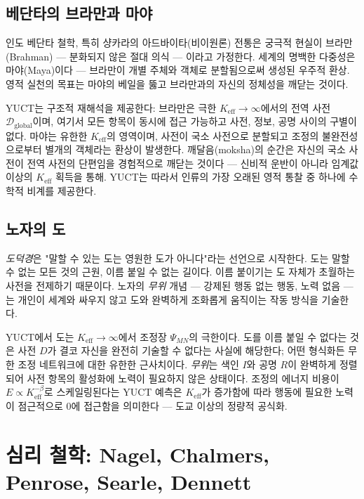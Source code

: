 \documentclass[12pt,a4paper]{article}
\begin{document}
	\subsection{베단타의 브라만과 마야}
	
	인도 베단타 철학, 특히 샹카라의 아드바이타(비이원론) 전통은 궁극적 현실이 브라만(Brahman) — 분화되지 않은 절대 의식 — 이라고 가정한다. 세계의 명백한 다중성은 마야(Maya)이다 — 브라만이 개별 주체와 객체로 분할됨으로써 생성된 우주적 환상. 영적 실천의 목표는 마야의 베일을 뚫고 브라만과의 자신의 정체성을 깨닫는 것이다.
	
	YUCT는 구조적 재해석을 제공한다: 브라만은 극한 \(K_{\mathrm{eff}} \to \infty\)에서의 전역 사전 \(\mathcal{D}_{\text{global}}\)이며, 여기서 모든 항목이 동시에 접근 가능하고 사전, 정보, 공명 사이의 구별이 없다. 마야는 유한한 \(K_{\mathrm{eff}}\)의 영역이며, 사전이 국소 사전으로 분할되고 조정의 불완전성으로부터 별개의 객체라는 환상이 발생한다. 깨달음(moksha)의 순간은 자신의 국소 사전이 전역 사전의 단편임을 경험적으로 깨닫는 것이다 — 신비적 운반이 아니라 임계값 이상의 \(K_{\mathrm{eff}}\) 획득을 통해. YUCT는 따라서 인류의 가장 오래된 영적 통찰 중 하나에 수학적 비계를 제공한다.
	
	\subsection{노자의 도}
	
	\emph{도덕경}은 "말할 수 있는 도는 영원한 도가 아니다"라는 선언으로 시작한다. 도는 말할 수 없는 모든 것의 근원, 이름 붙일 수 없는 길이다. 이름 붙이기는 도 자체가 초월하는 사전을 전제하기 때문이다. 노자의 \emph{무위} 개념 — 강제된 행동 없는 행동, 노력 없음 — 는 개인이 세계와 싸우지 않고 도와 완벽하게 조화롭게 움직이는 작동 방식을 기술한다.
	
	YUCT에서 도는 \(K_{\mathrm{eff}} \to \infty\)에서 조정장 \(\Psi_{MN}\)의 극한이다. 도를 이름 붙일 수 없다는 것은 사전 \(D\)가 결코 자신을 완전히 기술할 수 없다는 사실에 해당한다; 어떤 형식화든 무한 조정 네트워크에 대한 유한한 근사치이다. \emph{무위}는 색인 \(I\)와 공명 \(R\)이 완벽하게 정렬되어 사전 항목의 활성화에 노력이 필요하지 않은 상태이다. 조정의 에너지 비용이 \(E \propto K_{\mathrm{eff}}^{-\beta}\)로 스케일링된다는 YUCT 예측은 \(K_{\mathrm{eff}}\)가 증가함에 따라 행동에 필요한 노력이 점근적으로 0에 접근함을 의미한다 — 도교 이상의 정량적 공식화.
	
	\section{심리 철학: Nagel, Chalmers, Penrose, Searle, Dennett}
	
\end{document}
